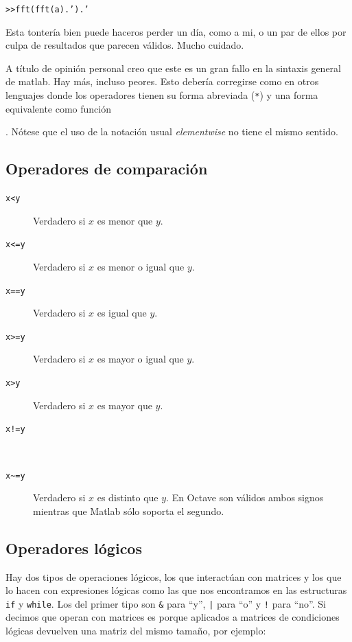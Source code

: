 \begin{description}
{    \texttt{>{}>fft(fft(a).').'}

    Esta tontería bien puede haceros perder un día, como a mi, o un
    par de ellos por culpa de resultados que parecen válidos. Mucho
    cuidado.

    A título de opinión personal creo que este es un gran fallo en la
    sintaxis general de matlab. Hay más, incluso peores. Esto debería
    corregirse como en otros lenguajes donde los operadores tienen su
    forma abreviada (\texttt{*}) y una forma equivalente como
    función}.  Nótese que el uso de la notación usual
  \emph{elementwise} no tiene el mismo sentido.
\end{description}

\subsection{Operadores de comparación}

\begin{description}
\item [\texttt{x<y}]Verdadero si $x$ es menor que $y$.
\item [\texttt{x<=y}]Verdadero si $x$ es menor o igual que $y$.
\item [\texttt{x==y}]Verdadero si $x$ es igual que $y$.
\item [\texttt{x>=y}]Verdadero si $x$ es mayor o igual que $y$.
\item [\texttt{x>y}]Verdadero si $x$ es mayor que $y$.
\item [\texttt{x!=y}]~
\item [\texttt{x\textasciitilde{}=y}]Verdadero si $x$ es distinto que
  $y$. En Octave son válidos ambos signos mientras que Matlab sólo
  soporta el segundo.
\end{description}

\subsection{Operadores lógicos}

Hay dos tipos de operaciones lógicos, los que interactúan con matrices
y los que lo hacen con expresiones lógicas como las que nos
encontramos en las estructuras \texttt{if} y \texttt{while}. Los del
primer tipo son \texttt{\&} para {}``y'', \texttt{|} para
{}``o'' y \texttt{!} para {}``no''. Si decimos que
operan con matrices es porque aplicados a matrices de condiciones
lógicas devuelven una matriz del mismo tamaño, por ejemplo:

